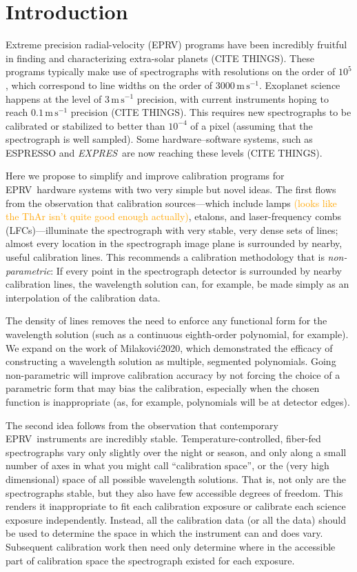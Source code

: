 \documentclass[twocolumn]{aastex63}
\newcommand{\lz}[1]{\textcolor{orange}{#1}}
\newcommand{\project}[1]{\textsl{#1}}
\newcommand{\acronym}[1]{{\small{#1}}}
\newcommand{\expres}{\project{\acronym{EXPRES}}}
\newcommand{\eprv}{\acronym{EPRV}}
\newcommand{\lfc}{\acronym{LFC}}
\newcommand{\mps}{\mathrm{m\,s^{-1}}}
\begin{document}

\section{Introduction} 
Extreme precision radial-velocity (\eprv) programs have been incredibly fruitful in finding and characterizing extra-solar planets (CITE THINGS).  These programs typically make use of spectrographs with resolutions on the order of $10^5$, which correspond to line widths on the order of $3000\,\mps$.  Exoplanet science happens at the level of $3\,\mps$ precision, with current instruments hoping to reach $0.1\,\mps$ precision (CITE THINGS).  This requires new spectrographs to be calibrated or stabilized to better than $10^{-4}$ of a pixel (assuming that the spectrograph is well sampled).    Some hardware--software systems, such as ESPRESSO and \expres\ are now reaching these levels (CITE THINGS).

Here we propose to simplify and improve calibration programs for \eprv\ hardware systems with two very simple but novel ideas.  The first flows from the observation that calibration sources---which include lamps \lz{(looks like the ThAr isn't quite good enough actually)}, etalons, and laser-frequency combs (\lfc s)---illuminate the spectrograph with very stable, very dense sets of lines; almost every location in the spectrograph image plane is surrounded by nearby, useful calibration lines.  This recommends a calibration methodology that is \emph{non-parametric}:  If every point in the spectrograph detector is surrounded by nearby calibration lines, the wavelength solution can, for example, be made simply as an interpolation of the calibration data.

The density of lines removes the need to enforce any functional form for the wavelength solution (such as a continuous eighth-order polynomial, for example).  We expand on the work of Milakovi\'{c}2020, which demonstrated the efficacy of constructing a wavelength solution as multiple, segmented polynomials.  Going non-parametric will improve calibration accuracy by not forcing the choice of a parametric form that may bias the calibration, especially when the chosen function is inappropriate (as, for example, polynomials will be at detector edges).

The second idea follows from the observation that contemporary \eprv\ instruments are incredibly stable.  Temperature-controlled, fiber-fed spectrographs vary only slightly over the night or season, and only along a small number of axes in what you might call ``calibration space'', or the (very high dimensional) space of all possible wavelength solutions.  That is, not only are the spectrographs stable, but they also have few accessible degrees of freedom.  This renders it inappropriate to fit each calibration exposure or calibrate each science exposure independently.  Instead, all the calibration data (or all the data) should be used to determine the space in which the instrument can and does vary.  Subsequent calibration work then need only determine where in the accessible part of calibration space the spectrograph existed for each exposure.
\end{document}
